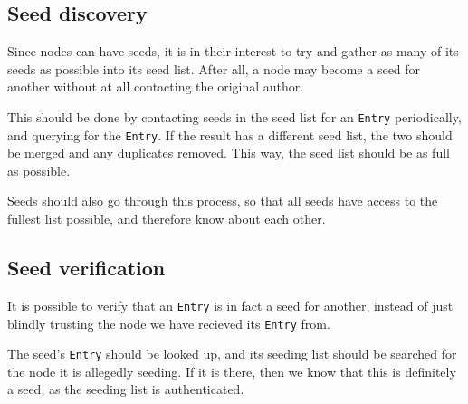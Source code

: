 	\subsection{Seed discovery}
	\begin{multicols}{2}
		Since nodes can have seeds, it is in their interest to try and
		gather as many of its seeds as possible into its seed list. After all, a
		node may become a seed for another without at all contacting the
		original author. 

		This should be done by contacting seeds in the seed list for an \texttt{Entry}
		periodically, and querying for the \texttt{Entry}. If the result has a different
		seed list, the two should be merged and any duplicates removed. This
		way, the seed list should be as full as possible.

		Seeds should also go through this process, so that all seeds have access
		to the fullest list possible, and therefore know about each other.
	\end{multicols}

	\subsection{Seed verification}
	\begin{multicols}{2}
		It is possible to verify that an \texttt{Entry} is in fact a seed for another,
		instead of just blindly trusting the node we have recieved its \texttt{Entry}
		from.

		The seed's \texttt{Entry} should be looked up, and its seeding list should be
		searched for the node it is allegedly seeding. If it is there, then we
		know that this is definitely a seed, as the seeding list is
		authenticated.
	\end{multicols}
